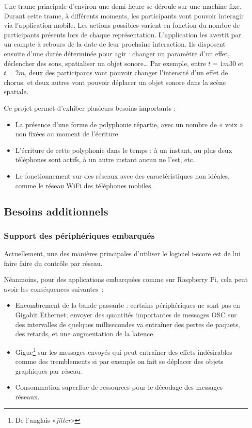 \documentclass[10pt]{article}
\begin{document}
Une trame principale d'environ une demi-heure se déroule sur une machine fixe.
Durant cette trame, à différents moments, les participants vont pouvoir interagir via l'application mobile. 
Les actions possibles varient en fonction du nombre de participants présents lors de chaque représentation.
L'application les avertit par un compte à rebours de la date de leur prochaine interaction. 
Ils disposent ensuite d'une durée déterminée pour agir : changer un paramètre d'un effet, déclencher des sons, spatialiser un objet sonore\dots{}
Par exemple, entre $t=1m30$ et $t=2m$, deux des participants vont pouvoir changer l'intensité d'un effet de chorus, et deux autres vont pouvoir déplacer un objet sonore dans la scène spatiale. 

Ce projet permet d'exhiber plusieurs besoins importants : 
\begin{itemize}
    \item La présence d'une forme de polyphonie répartie, avec un nombre de « voix » non fixées au moment de l'écriture.
    \item L'écriture de cette polyphonie dans le temps : à un instant, au plus deux téléphones sont actifs, à  un autre instant aucun ne l'est, etc.
    \item Le fonctionnement sur des réseaux avec des caractéristiques non idéales, comme le réseau WiFi des téléphones mobiles.
\end{itemize}

\subsection{Besoins additionnels}
\subsubsection{Support des périphériques embarqués}
Actuellement, une des manières principales d'utiliser le logiciel i-score est de lui faire faire du contrôle par réseau. 

Néanmoins, pour des applications embarquées comme sur Raspberry Pi, cela peut avoir les conséquences suivantes~: 
\begin{itemize}
    \item Encombrement de la bande passante : certains périphériques ne sont pas en Gigabit Ethernet; envoyer des quantités importantes de messages OSC sur des intervalles de quelques millisecondes va entraîner des pertes de paquets, des retards, et une augmentation de la latence.
    \item Gigue\footnote{De l'anglais «\textit{jitter}»} sur les messages envoyés qui peut entraîner des effets indésirables comme des tremblements si par exemple on fait se déplacer des objets graphiques par réseau.
    \item Consommation superflue de ressources pour le décodage des messages réseaux.
\end{itemize}
\end{document}
